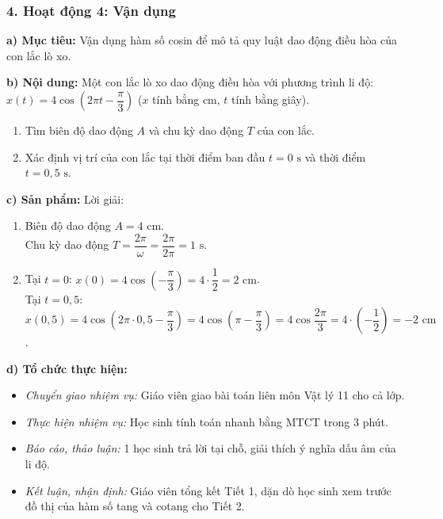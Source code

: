 \documentclass[12pt, a4paper]{article}
\begin{document}
\subsubsection*{4. Hoạt động 4: Vận dụng}
\textbf{a) Mục tiêu:} Vận dụng hàm số cosin để mô tả quy luật dao động điều hòa của con lắc lò xo.

\textbf{b) Nội dung:}
Một con lắc lò xo dao động điều hòa với phương trình li độ: $x(t) = 4\cos\left(2\pi t - \dfrac{\pi}{3}\right)$ ($x$ tính bằng cm, $t$ tính bằng giây).
\begin{enumerate}[leftmargin=0.5cm]
    \item Tìm biên độ dao động $A$ và chu kỳ dao động $T$ của con lắc.
    \item Xác định vị trí của con lắc tại thời điểm ban đầu $t = 0\text{ s}$ và thời điểm $t = 0{,}5\text{ s}$.
\end{enumerate}

\textbf{c) Sản phẩm:} Lời giải:
\begin{enumerate}[leftmargin=0.5cm]
    \item Biên độ dao động $A = 4\text{ cm}$.\\
    Chu kỳ dao động $T = \dfrac{2\pi}{\omega} = \dfrac{2\pi}{2\pi} = 1\text{ s}$.
    \item Tại $t = 0$: $x(0) = 4\cos\left(-\dfrac{\pi}{3}\right) = 4 \cdot \dfrac{1}{2} = 2\text{ cm}$.\\
    Tại $t = 0{,}5$: $x(0{,}5) = 4\cos\left(2\pi \cdot 0{,}5 - \dfrac{\pi}{3}\right) = 4\cos\left(\pi - \dfrac{\pi}{3}\right) = 4\cos\dfrac{2\pi}{3} = 4 \cdot \left(-\dfrac{1}{2}\right) = -2\text{ cm}$.
\end{enumerate}

\textbf{d) Tổ chức thực hiện:}
\begin{itemize}[leftmargin=0.6cm]
    \item \textit{Chuyển giao nhiệm vụ:} Giáo viên giao bài toán liên môn Vật lý 11 cho cả lớp.
    \item \textit{Thực hiện nhiệm vụ:} Học sinh tính toán nhanh bằng MTCT trong 3 phút.
    \item \textit{Báo cáo, thảo luận:} 1 học sinh trả lời tại chỗ, giải thích ý nghĩa dấu âm của li độ.
    \item \textit{Kết luận, nhận định:} Giáo viên tổng kết Tiết 1, dặn dò học sinh xem trước đồ thị của hàm số tang và cotang cho Tiết 2.
\end{itemize}

\vspace{10pt}
\end{document}
